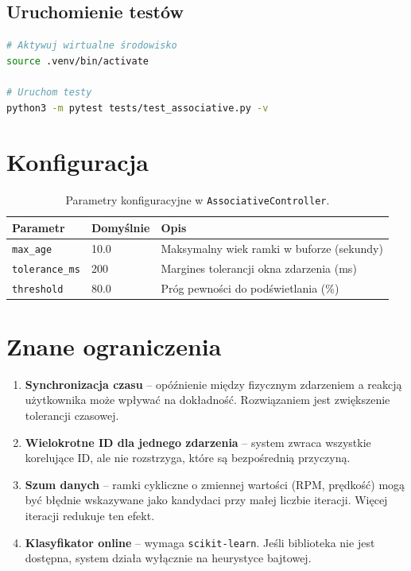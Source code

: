 \documentclass[a4paper,12pt]{article}
\begin{document}
\subsection{Uruchomienie testów}
\begin{lstlisting}[language=bash]
# Aktywuj wirtualne środowisko
source .venv/bin/activate

# Uruchom testy
python3 -m pytest tests/test_associative.py -v
\end{lstlisting}

\section{Konfiguracja}

\begin{table}[H]
\centering
\begin{tabular}{|l|l|l|}
\hline
\textbf{Parametr} & \textbf{Domyślnie} & \textbf{Opis} \\
\hline
\texttt{max\_age} & 10.0 & Maksymalny wiek ramki w buforze (sekundy) \\
\hline
\texttt{tolerance\_ms} & 200 & Margines tolerancji okna zdarzenia (ms) \\
\hline
\texttt{threshold} & 80.0 & Próg pewności do podświetlania (\%) \\
\hline
\end{tabular}
\caption{Parametry konfiguracyjne w \texttt{AssociativeController}.}
\end{table}

\section{Znane ograniczenia}

\begin{enumerate}[noitemsep]
    \item \textbf{Synchronizacja czasu} – opóźnienie między fizycznym zdarzeniem a reakcją użytkownika może wpływać na dokładność. Rozwiązaniem jest zwiększenie tolerancji czasowej.
    \item \textbf{Wielokrotne ID dla jednego zdarzenia} – system zwraca wszystkie korelujące ID, ale nie rozstrzyga, które są bezpośrednią przyczyną.
    \item \textbf{Szum danych} – ramki cykliczne o zmiennej wartości (RPM, prędkość) mogą być błędnie wskazywane jako kandydaci przy małej liczbie iteracji. Więcej iteracji redukuje ten efekt.
    \item \textbf{Klasyfikator online} – wymaga \texttt{scikit-learn}. Jeśli biblioteka nie jest dostępna, system działa wyłącznie na heurystyce bajtowej.
\end{enumerate}
\end{document}
